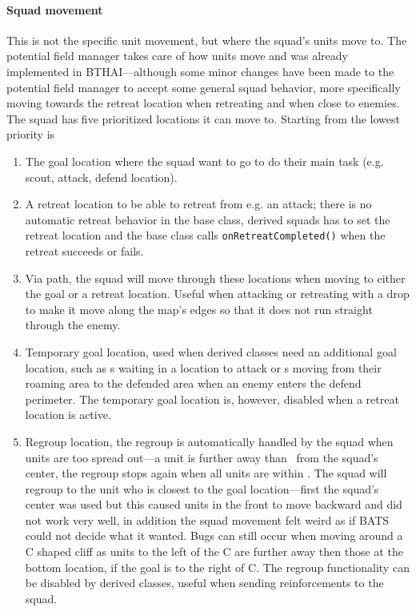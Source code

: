 \paragraph{Squad movement}
This is not the specific unit movement, but where the squad's units move to. The potential field
manager takes care of how units move and was already implemented in BTHAI\cite{bthai}—although some
minor changes have been made to the potential field manager to accept some general squad behavior,
more specifically moving towards the retreat location when retreating and when close to enemies. The
squad has five prioritized locations it can move to. Starting from the lowest priority is
\begin{enumerate}
	\item The goal location where the squad want to go to do their main task (e.g. scout, attack,
		defend location).
	\item A retreat location to be able to retreat from e.g. an attack; there is no automatic retreat
		behavior in the base class, derived squads has to set the retreat location and the base class
		calls \texttt{onRetreatCompleted()} when the retreat succeeds or fails.
	\item Via path, the squad will move through these locations when moving to either the goal or a
		retreat location. Useful when attacking or retreating with a drop to make it move along
		the map's edges so that it does not run straight through the enemy.
	\item Temporary goal location, used when derived classes need an additional goal location, such as
		s waiting in a location to attack or s moving
		from their roaming area to the defended area when an enemy enters the defend perimeter. The
		temporary goal location is, however, disabled when a retreat location is active.
	\item Regroup location, the regroup is automatically handled by the squad when units are too
		spread out—a unit is further away than \squadRegroupDistanceBegin~from the squad's center, the
		regroup stops again when all units are within \squadRegroupDistanceEnd. The squad will regroup
		to the unit who is closest to the goal location—first the squad's center was used but this
		caused units in the front to move backward and did not work very well, in addition the squad
		movement felt weird as if BATS could not decide what it wanted. Bugs can still occur when moving
		around a C shaped cliff as units to the left of the C are further away then those at the bottom
		location, if the goal is to the right of C. The regroup functionality can be disabled by derived
		classes, useful when sending reinforcements to the squad.
\end{enumerate}

